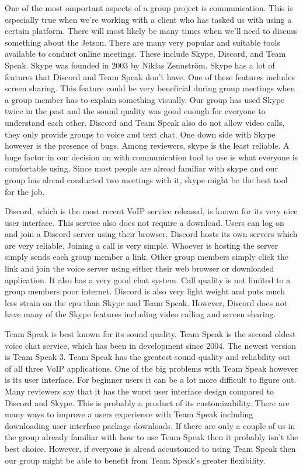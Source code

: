 \documentclass{scrreprt}
\begin{document}
One of the most omportant aspects of a group project is communication.
This is especially true when we're working with a client who has tasked us with using a certain platform.
There will most likely be many times when we'll need to discuss something about the Jetson.
There are many very popular and suitable tools available to conduct online meetings.
These include Skype, Discord, and Team Speak.
Skype was founded in 2003 by Niklas Zennström.
Skype has a lot of features that Discord and Team Speak don't have.
One of these features includes screen sharing.
This feature could be very beneficial during group meetings when a group member has to explain something visually.
Our group has used Skype twice in the past and the sound quality was good enough for everyone to understand each other.
Discord and Team Speak also do not allow video calls, they only provide groups to voice and text chat.
One down side with Skype however is the presence of bugs.
Among reviewers, skype is the least reliable.
A huge factor in our decision on with communication tool to use is what everyone is comfortable using.
Since most people are alread familiar with skype and our group has alread conducted two meetings with it, skype might be the best tool for the job.

Discord, which is the most recent VoIP service released, is known for its very nice user interface.
This service also does not require a download.
Users can log on and join a Discord server using their browser.
Discord hosts its own servers which are very reliable.
Joining a call is very simple.
Whoever is hosting the server simply sends each group member a link.
Other group members simply click the link and join the voice server using either their web browser or downloaded application.
It also has a very good chat system.
Call quality is not limited to a group members poor internet.
Discord is also very light weight and puts much less strain on the cpu than Skype and Team Speak.
However, Discord does not have many of the Skype features including video calling and screen sharing.

Team Speak is best known for its sound quality.
Team Speak is the second oldest voice chat service, which has been in development since 2004.
The newest version is Team Speak 3.
Team Speak has the greatest sound quality and reliability out of all three VoIP applications.
One of the big problems with Team Speak however is its user interface.
For beginner users it can be a lot more difficult to figure out.
Many reviewers say that it has the worst user interface design compared to Discord and Skype.
This is probably a product of its customizability.
There are many ways to improve a users experience with Team Speak including downloading user interface package downloads.
If there are only a couple of us in the group already familiar with how to use Team Speak then it probably isn't the best choice.
However, if everyone is alread accustomed to using Team Speak then our group might be able to benefit from Team Speak's greater flexibility.
\end{document}
